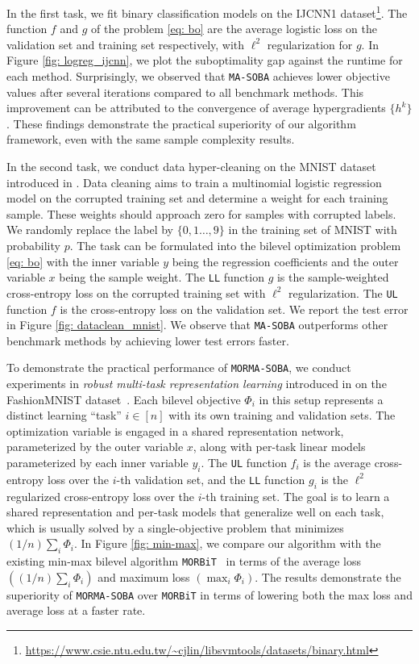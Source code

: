 \documentclass[10pt]{article}
\theoremstyle{remark}
\begin{document}
In the first task, we fit binary classification models on the IJCNN1 dataset\footnote{\url{https://www.csie.ntu.edu.tw/~cjlin/libsvmtools/datasets/binary.html}}. The function $f$ and $g$ of the problem \eqref{eq: bo} are the average logistic loss on the validation set and training set respectively, with $\ell^2$ regularization for $g$. In Figure \ref{fig: logreg_ijcnn}, we plot the suboptimality gap against the runtime for each method. Surprisingly, we observed that \texttt{MA-SOBA} achieves lower objective values after several iterations compared to all benchmark methods. This improvement can be attributed to the convergence of average hypergradients $\{h^k\}$. These findings demonstrate the practical superiority of our algorithm framework, even with the same sample complexity results.

In the second task, we conduct data hyper-cleaning on the MNIST dataset introduced in \cite{franceschi2017forward}. Data cleaning aims to train a multinomial logistic regression model on the corrupted training set and determine a weight for each training sample. These weights should approach zero for samples with corrupted labels. We randomly replace the label by $\{0,1\dots, 9\}$ in the training set of MNIST with probability $p$. The task can be formulated into the bilevel optimization problem \eqref{eq: bo} with the inner variable $y$ being the regression coefficients and the outer variable $x$ being the sample weight. The \texttt{LL} function $g$ is the sample-weighted cross-entropy loss on the corrupted training set with $\ell^2$ regularization. The \texttt{UL} function $f$ is the cross-entropy loss on the validation set. We report the test error in Figure \ref{fig: dataclean_mnist}. We observe that \texttt{MA-SOBA} outperforms other benchmark methods by achieving lower test errors faster.


To demonstrate the practical performance of \texttt{MORMA-SOBA}, we conduct experiments in \emph{robust multi-task representation learning} introduced in \cite{gu2022min} on the FashionMNIST dataset~\cite{xiao2017online}. Each bilevel objective $\Phi_i$ in this setup represents a distinct learning ``task'' $i\in[n]$ with its own training and validation sets. The optimization variable is engaged in a shared representation network, parameterized by the outer variable $x$, along with per-task linear models parameterized by each inner variable $y_i$. The \texttt{UL} function $f_i$ is the average cross-entropy loss over the $i$-th validation set, and the \texttt{LL} function $g_i$ is the $\ell^2$ regularized cross-entropy loss over the $i$-th training set. The goal is to learn a shared representation and per-task models that generalize well on each task, which is usually solved by a single-objective problem that minimizes $(1/n)\sum_i \Phi_i$. In Figure \ref{fig: min-max}, we compare our algorithm with the existing min-max bilevel algorithm \texttt{MORBiT}~\cite{gu2022min} in terms of the average loss $((1/n)\sum_i \Phi_i)$ and maximum loss $(\max_i \Phi_i)$. The results demonstrate the superiority of \texttt{MORMA-SOBA} over \texttt{MORBiT} in terms of lowering both the max loss and average loss at a faster rate.  
\end{document}

